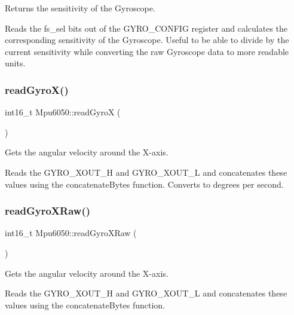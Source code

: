 Returns the sensitivity of the Gyroscope. 

Reads the fs\+\_\+sel bits out of the G\+Y\+R\+O\+\_\+\+C\+O\+N\+F\+IG register and calculates the corresponding sensitivity of the Gyroscope. Useful to be able to divide by the current sensitivity while converting the raw Gyroscope data to more readable units. \mbox{\label{classMpu6050_a9ec9443071ff4c69d08aa5aada80a1ad}} 
\subsubsection{\texorpdfstring{read\+Gyro\+X()}{readGyroX()}}
{\footnotesize\ttfamily int16\+\_\+t Mpu6050\+::read\+GyroX (\begin{DoxyParamCaption}{ }\end{DoxyParamCaption})\hspace{0.3cm}{\ttfamily [virtual]}}



Gets the angular velocity around the X-\/axis. 

Reads the G\+Y\+R\+O\+\_\+\+X\+O\+U\+T\+\_\+H and G\+Y\+R\+O\+\_\+\+X\+O\+U\+T\+\_\+L and concatenates these values using the concatenate\+Bytes function. Converts to degrees per second. \mbox{\label{classMpu6050_a8047b6ee1c7e151664e5d8bc94dd3c11}} 
\subsubsection{\texorpdfstring{read\+Gyro\+X\+Raw()}{readGyroXRaw()}}
{\footnotesize\ttfamily int16\+\_\+t Mpu6050\+::read\+Gyro\+X\+Raw (\begin{DoxyParamCaption}{ }\end{DoxyParamCaption})\hspace{0.3cm}{\ttfamily [virtual]}}



Gets the angular velocity around the X-\/axis. 

Reads the G\+Y\+R\+O\+\_\+\+X\+O\+U\+T\+\_\+H and G\+Y\+R\+O\+\_\+\+X\+O\+U\+T\+\_\+L and concatenates these values using the concatenate\+Bytes function. \mbox{\label{classMpu6050_a32291036eb3c88455bc8054d5014d99c}} 
